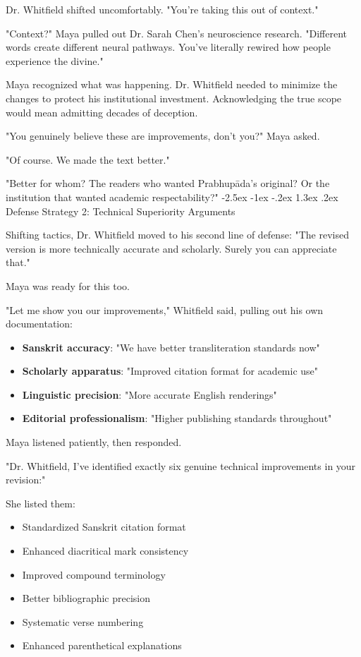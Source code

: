 \documentclass[12pt,twoside]{book}
\makeatletter
\renewcommand\section{\@startsection{section}{1}{\z@}%
{-2.5ex \@plus -1ex \@minus -.2ex}%
{1.3ex \@plus.2ex}%
{\normalfont\Large\bfseries}}
\makeatother
\begin{document}
Dr. Whitfield shifted uncomfortably. "You're taking this out of context."

"Context?" Maya pulled out Dr. Sarah Chen's neuroscience research. "Different words create different neural pathways. You've literally rewired how people experience the divine."

Maya recognized what was happening. Dr. Whitfield needed to minimize the changes to protect his institutional investment. Acknowledging the true scope would mean admitting decades of deception.

"You genuinely believe these are improvements, don't you?" Maya asked.

"Of course. We made the text better."

"Better for whom? The readers who wanted Prabhupāda's original? Or the institution that wanted academic respectability?"
\section{Defense Strategy 2: Technical Superiority Arguments}
\label{sec:org19783c5}

Shifting tactics, Dr. Whitfield moved to his second line of defense: "The revised version is more technically accurate and scholarly. Surely you can appreciate that."

Maya was ready for this too.

"Let me show you our improvements," Whitfield said, pulling out his own documentation:

\begin{itemize}
\item \textbf{\textbf{Sanskrit accuracy}}: "We have better transliteration standards now"
\item \textbf{\textbf{Scholarly apparatus}}: "Improved citation format for academic use"
\item \textbf{\textbf{Linguistic precision}}: "More accurate English renderings"
\item \textbf{\textbf{Editorial professionalism}}: "Higher publishing standards throughout"
\end{itemize}

Maya listened patiently, then responded.

"Dr. Whitfield, I've identified exactly six genuine technical improvements in your revision:"

She listed them:
\begin{itemize}
\item Standardized Sanskrit citation format
\item Enhanced diacritical mark consistency
\item Improved compound terminology
\item Better bibliographic precision
\item Systematic verse numbering
\item Enhanced parenthetical explanations
\end{itemize}
\end{document}
